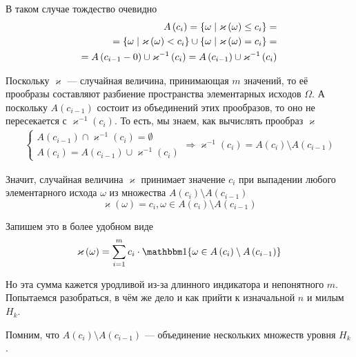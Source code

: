В таком случае тождество очевидно
\begin{align*}
A\left( c_i \right)
  = \left\{ \omega \;\middle|\; \varkappa\left( \omega \right) \le c_i \right\} = \\
  = \left\{ \omega \;\middle|\; \varkappa\left( \omega \right) < c_i \right\} \cup
      \left\{ \omega \;\middle|\; \varkappa\left( \omega \right) = c_i \right\} = \\
  = A\left( c_{i-1}-0 \right) \cup \varkappa^{-1}\left( c_i \right)
  = A\left( c_{i-1} \right) \cup \varkappa^{-1}\left( c_i \right)
\end{align*}

Поскольку $\varkappa$ --- случайная величина, принимающая $m$ значений,
то её прообразы составляют разбиение пространства элементарных исходов $\Omega$.
А поскольку $A\left( c_{i-1} \right)$ состоит из объединений этих прообразов,
то оно не пересекается с $\varkappa^{-1}\left( c_i \right)$.
То есть, мы знаем, как вычислять прообраз $\varkappa$
\begin{align*}
  \begin{cases}
      A\left( c_{i-1} \right) \cap \varkappa^{-1}\left( c_i \right)
      = \emptyset \\
      A\left( c_i \right)
      = A\left( c_{i-1} \right) \cup \varkappa^{-1}\left( c_i \right)
  \end{cases}
  \Rightarrow \varkappa^{-1}\left( c_i \right) =
      A\left( c_{i} \right) \setminus A\left( c_{i-1} \right)
\end{align*}

Значит, случайная величина $\varkappa$ принимает значение $c_i$
при выпадении любого элементарного исхода $\omega$
из множества $A\left( c_{i} \right) \setminus A\left( c_{i-1} \right)$
\begin{equation}\label{randomVariableFirst}
  \varkappa\left( \omega \right) = c_i,
      \omega \in A\left( c_{i} \right) \setminus A\left( c_{i-1} \right)
\end{equation}

Запишем это в более удобном виде
$$\varkappa\left( \omega \right)
  = \sum_{i=1}^m c_i \cdot \Indicator{\omega
      \in A\left( c_{i} \right) \setminus A\left( c_{i-1} \right)}$$

Но эта сумма кажется уродливой из-за длинного индикатора и непонятного $m$.
Попытаемся разобраться,
в чём же дело и как прийти к изначальной $n$ и милым $H_k$.

Помним, что $A\left( c_{i} \right) \setminus A\left( c_{i-1} \right)$ ---
объединение нескольких множеств уровня $H_k$.

